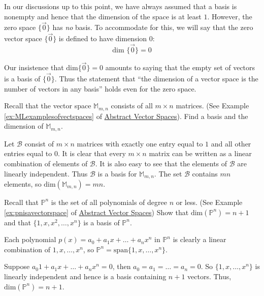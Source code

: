 \documentclass{ximera}
\begin{document}
In our discussions up to this point, we have always assumed that a basis is nonempty and hence that the dimension of the space is at least $1$. However, the zero space $\{\vec{0}\}$ has {\it no} basis.  To accommodate for this, we will say that the zero vector space $\{\vec{0}\}$ is defined to have dimension $0$:
\begin{equation*}
\mbox{dim }\{\vec{0}\} = 0
\end{equation*}

Our insistence that $\mbox{dim}\{\vec{0}\} = 0$ amounts to saying that the empty set of vectors is a basis of $\{\vec{0}\}$. Thus the statement that ``the dimension of a vector space is the number of vectors in any basis'' holds even for the zero space. 

\begin{example}\label{ex:dimofM}
Recall that the vector space $\mathbb{M}_{m,n}$ consists of all $m\times n$ matrices. (See Example \ref{ex:MLexamplesofvectspaces} of \href{https://ximera.osu.edu/linearalgebradzv3/LinearAlgebraInteractiveIntro/VSP-0050/main}{Abstract Vector Spaces}).  Find a basis and the dimension of $\mathbb{M}_{m,n}$.
\begin{explanation}
Let $\mathcal{B}$ consist of $m\times n$ matrices 
 with exactly one entry equal to $1$ and all other entries equal to $0$. It is clear that every $m\times n$ matrix can be written as a linear combination of elements of $\mathcal{B}$.  It is also easy to see that the elements of $\mathcal{B}$ are linearly independent.  Thus $\mathcal{B}$ is a basis for $\mathbb{M}_{m,n}$.  The set $\mathcal{B}$ contains $mn$ elements, so $\mbox{dim}(\mathbb{M}_{m,n})=mn$.
\end{explanation}
\end{example}

\begin{example}\label{ex:dimofP}
Recall that $\mathbb{P}^n$ is the set of all polynomials of degree $n$ or less.  (See Example \ref{ex:pnisavectorspace} of \href{https://ximera.osu.edu/linearalgebradzv3/LinearAlgebraInteractiveIntro/VSP-0050/main}{Abstract Vector Spaces}) Show that $\mbox{dim}( \mathbb{P}^{n}) = n + 1$ and that $\{1, x, x^{2}, \dots, x^{n}\}$ is a basis of $\mathbb{P}^{n}$.

\begin{explanation}
Each polynomial $p(x) = a_{0} + a_{1}x + \ldots + a_{n}x^{n}$ in $\mathbb{P}^{n}$ is clearly a linear combination of $1, x, \dots, x^{n}$, so $\mathbb{P}^{n} = \mbox{span}\{1, x, \dots, x^{n}\}$. 

Suppose $a_{0}1 + a_{1}x + \dots + a_{n}x^{n} = 0$, then $a_{0} = a_{1} = \ldots = a_{n} = 0$. So $\{1, x, \dots, x^{n}\}$ is linearly independent and hence is a basis containing $n + 1$ vectors. Thus, $\mbox{dim}(\mathbb{P}^{n}) = n + 1$.
\end{explanation}
\end{example}
\end{document}
